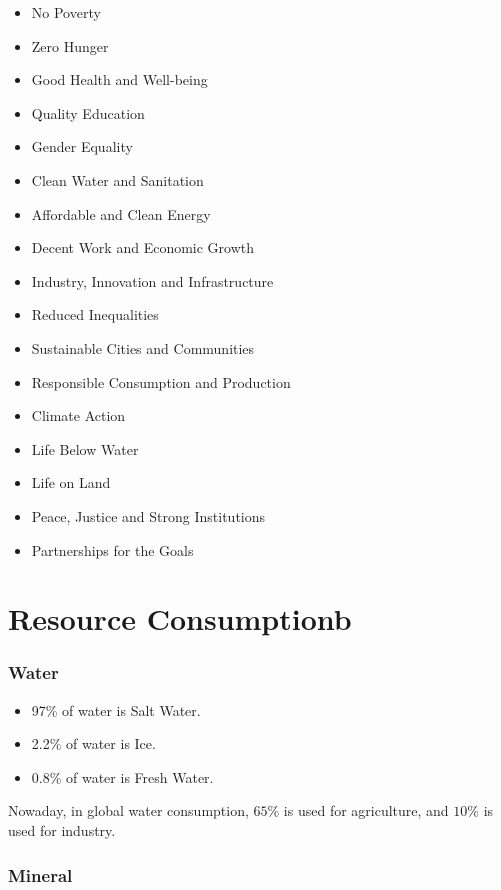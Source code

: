 \documentclass{NoteThesis/note-thesis}
\begin{document}
\begin{itemize}
    \item No Poverty
    \item Zero Hunger
    \item Good Health and Well-being
    \item Quality Education
    \item Gender Equality
    \item Clean Water and Sanitation
    \item Affordable and Clean Energy
    \item Decent Work and Economic Growth
    \item Industry, Innovation and Infrastructure
    \item Reduced Inequalities
    \item Sustainable Cities and Communities
    \item Responsible Consumption and Production
    \item Climate Action
    \item Life Below Water
    \item Life on Land
    \item Peace, Justice and Strong Institutions
    \item Partnerships for the Goals
\end{itemize}

\section{Resource Consumptionb}
\label{resource}

\subsubsection*{Water}

\begin{itemize}
    \item 97\% of water is Salt Water.
    \item 2.2\% of water is Ice.
    \item 0.8\% of water is Fresh Water.
\end{itemize}

Nowaday, in global water consumption, $65\%$ is used for agriculture, and $10\%$ is used for industry.

\subsubsection*{Mineral}
\end{document}
